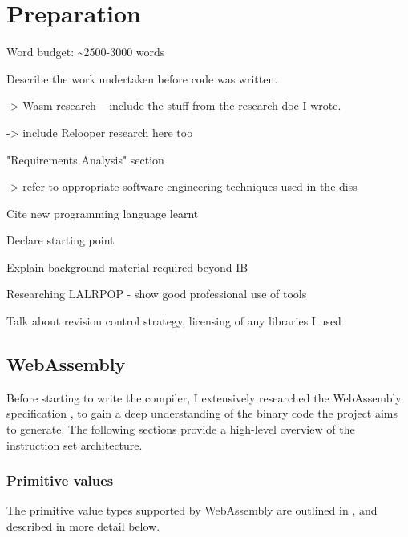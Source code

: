 \documentclass[00-main.tex]{subfiles}
\begin{document}
\chapter{Preparation}

\begin{mrwComment}
Word budget: \textasciitilde 2500-3000 words
\end{mrwComment}

\begin{mrwComment}
Describe the work undertaken before code was written.

-> Wasm research -- include the stuff from the research doc I wrote.

-> include Relooper research here too

"Requirements Analysis" section

-> refer to appropriate software engineering techniques used in the diss

Cite new programming language learnt

Declare starting point

Explain background material required beyond IB

Researching LALRPOP - show good professional use of tools

Talk about revision control strategy, licensing of any libraries I used
\end{mrwComment}

\section{WebAssembly}

Before starting to write the compiler, I extensively researched the WebAssembly specification , to gain a deep understanding of the binary code the project aims to generate.
The following sections provide a high-level overview of the instruction set architecture.

\subsection{Primitive values}

The primitive value types supported by WebAssembly are outlined in , and described in more detail below.
\end{document}
